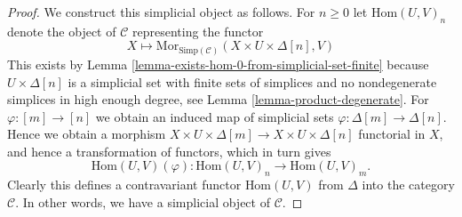 \begin{proof}
We construct this simplicial object as follows.
For $n \geq 0$ let $\text{Hom}(U, V)_n$ denote
the object of $\mathcal{C}$ representing the
functor
$$
X
\longmapsto
\text{Mor}_{\text{Simp}(\mathcal{C})}(X \times U \times \Delta[n], V)
$$
This exists by Lemma \ref{lemma-exists-hom-0-from-simplicial-set-finite} 
because $U \times \Delta[n]$ is a simplicial set with finite
sets of simplices and no nondegenerate simplices in high enough degree,
see Lemma \ref{lemma-product-degenerate}.
For $\varphi : [m] \to [n]$ we obtain an induced map of simplicial
sets $\varphi : \Delta[m] \to \Delta[n]$. Hence we obtain a morphism
$X \times U \times \Delta[m] \to X \times U \times \Delta[n]$
functorial in $X$, and hence a transformation of functors,
which in turn gives
$$
\text{Hom}(U, V)(\varphi) :
\text{Hom}(U, V)_n
\longrightarrow
\text{Hom}(U, V)_m.
$$
Clearly this defines a contravariant functor
$\text{Hom}(U, V)$ from
$\Delta$ into the category $\mathcal{C}$.
In other words, we have a simplicial object of $\mathcal{C}$.


\end{proof}
